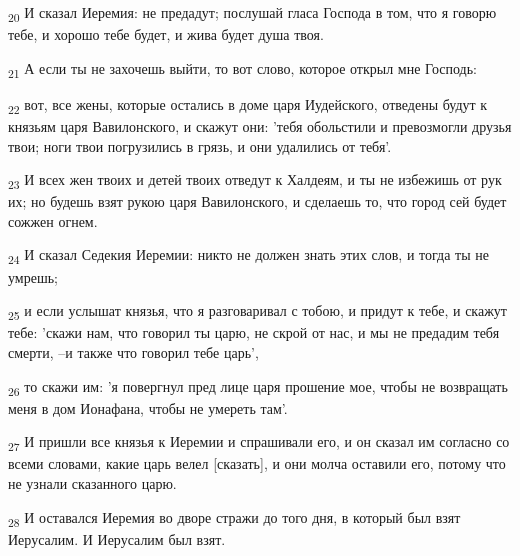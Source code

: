 \begin{tcolorbox}
\textsubscript{20} И сказал Иеремия: не предадут; послушай гласа Господа в том, что я говорю тебе, и хорошо тебе будет, и жива будет душа твоя.
\end{tcolorbox}
\begin{tcolorbox}
\textsubscript{21} А если ты не захочешь выйти, то вот слово, которое открыл мне Господь:
\end{tcolorbox}
\begin{tcolorbox}
\textsubscript{22} вот, все жены, которые остались в доме царя Иудейского, отведены будут к князьям царя Вавилонского, и скажут они: 'тебя обольстили и превозмогли друзья твои; ноги твои погрузились в грязь, и они удалились от тебя'.
\end{tcolorbox}
\begin{tcolorbox}
\textsubscript{23} И всех жен твоих и детей твоих отведут к Халдеям, и ты не избежишь от рук их; но будешь взят рукою царя Вавилонского, и сделаешь то, что город сей будет сожжен огнем.
\end{tcolorbox}
\begin{tcolorbox}
\textsubscript{24} И сказал Седекия Иеремии: никто не должен знать этих слов, и тогда ты не умрешь;
\end{tcolorbox}
\begin{tcolorbox}
\textsubscript{25} и если услышат князья, что я разговаривал с тобою, и придут к тебе, и скажут тебе: 'скажи нам, что говорил ты царю, не скрой от нас, и мы не предадим тебя смерти, --и также что говорил тебе царь',
\end{tcolorbox}
\begin{tcolorbox}
\textsubscript{26} то скажи им: 'я повергнул пред лице царя прошение мое, чтобы не возвращать меня в дом Ионафана, чтобы не умереть там'.
\end{tcolorbox}
\begin{tcolorbox}
\textsubscript{27} И пришли все князья к Иеремии и спрашивали его, и он сказал им согласно со всеми словами, какие царь велел [сказать], и они молча оставили его, потому что не узнали сказанного царю.
\end{tcolorbox}
\begin{tcolorbox}
\textsubscript{28} И оставался Иеремия во дворе стражи до того дня, в который был взят Иерусалим. И Иерусалим был взят.
\end{tcolorbox}
